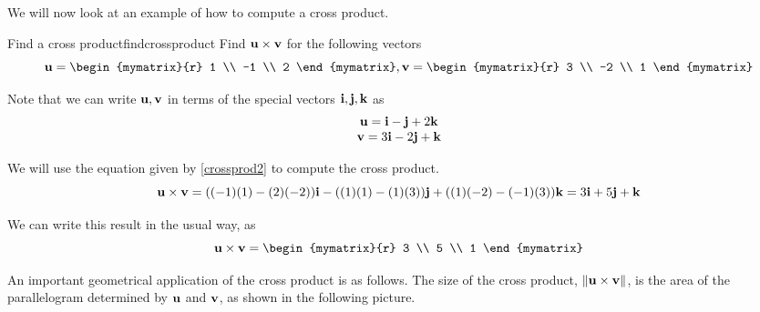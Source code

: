 We will now look at an example of how to compute a cross product.

\begin{example}{Find a cross product}{findcrossproduct}
Find ${\bf u} \times {\bf v}$ for the following vectors
\begin{equation*}
\vect{u}
=
\begin{mymatrix}{r}
1 \\
-1 \\
2
\end{mymatrix},
\vect{v}
=
\begin{mymatrix}{r}
3 \\
-2 \\
1
\end{mymatrix}
\end{equation*}
\end{example}

\begin{solution}
Note that we can write ${\bf u}, {\bf v}$ in terms of the special vectors ${\bf i},
{\bf j}, {\bf k}$ as 
\begin{equation*}
\begin{array}{c}
{\bf u}
=
{\bf i}-{\bf j}+2{\bf k} \\
{\bf v}
=
 3{\bf i}-2{\bf j}+{\bf k}
\end{array}
\end{equation*}

We will use the equation given by \ref{crossprod2} to compute the cross product. 
\begin{equation*}
{\bf u} \times {\bf v}
=((-1)(1)-(2)(-2)) {\bf i}- ((1)(1)-(1)(3)) {\bf j}+((1)(-2)-(-1)(3)) {\bf k}=3{\bf i}+5{\bf j}+{\bf k}
\end{equation*}

We can write this result in the usual way, as
\begin{equation*}
\vect{u} \times \vect{v}
=
\begin{mymatrix}{r}
3 \\
5 \\
1
\end{mymatrix}
\end{equation*}

\end{solution}

An important geometrical application of the cross product is as follows. The size of the cross product, $\| {\bf u}\times {\bf v}\| $, is the area of the
parallelogram determined by ${\bf u}$ and ${\bf v}$, as shown in the following picture. 

